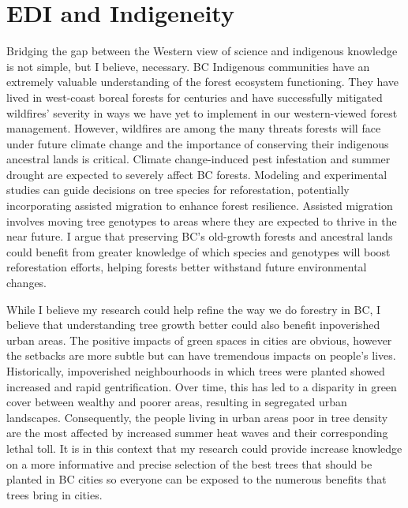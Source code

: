 \documentclass[11pt,letter]{article}
\begin{document}
\section *{EDI and Indigeneity}
Bridging the gap between the Western view of science and indigenous knowledge is not simple, but I believe, necessary. BC Indigenous communities have an extremely valuable understanding of the forest ecosystem functioning. They have lived in west-coast boreal forests for centuries and have successfully mitigated wildfires' severity in ways we have yet to implement in our western-viewed forest management. However, wildfires are among the many threats forests will face under future climate change and the importance of conserving their indigenous ancestral lands is critical. Climate change-induced pest infestation and summer drought are expected to severely affect BC forests. Modeling and experimental studies can guide decisions on tree species for reforestation, potentially incorporating assisted migration to enhance forest resilience. Assisted migration involves moving tree genotypes to areas where they are expected to thrive in the near future. I argue that preserving BC's old-growth forests and ancestral lands could benefit from greater knowledge of which species and genotypes will boost reforestation efforts, helping forests better withstand future environmental changes.
\par 
While I believe my research could help refine the way we do forestry in BC, I believe that understanding tree growth better could also benefit inpoverished urban areas. The positive impacts of green spaces in cities are obvious, however the setbacks are more subtle but can have tremendous impacts on people's lives. Historically, impoverished neighbourhoods in which trees were planted showed increased and rapid gentrification. Over time, this has led to a disparity in green cover between wealthy and poorer areas, resulting in segregated urban landscapes. Consequently, the people living in urban areas poor in tree density are the most affected by increased summer heat waves and their corresponding lethal toll. It is in this context that my research could provide increase knowledge on a more informative and precise selection of the best trees that should be planted in BC cities so everyone can be exposed to the numerous benefits that trees bring in cities. 

\end{document}
